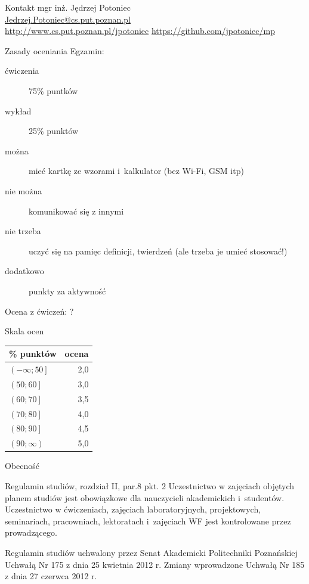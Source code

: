 \documentclass{mp}
\subtitle{Uwagi organizacyjne}
\begin{document}
\begin{frame}
\titlepage
\end{frame}
\begin{frame}{Kontakt}
mgr inż. Jędrzej Potoniec \\
\url{Jedrzej.Potoniec@cs.put.poznan.pl}\\
\url{http://www.cs.put.poznan.pl/jpotoniec}
\url{https://github.com/jpotoniec/mp}
\end{frame}
\begin{frame}{Zasady oceniania}
Egzamin:
\begin{description}
\item[ćwiczenia] 75\% puntków
\item[wykład] 25\% punktów
\item[można] mieć kartkę ze wzorami i~kalkulator (bez Wi-Fi, GSM itp)
\item[nie można] komunikować się z innymi
\item[nie trzeba] uczyć się na pamięc definicji, twierdzeń (ale trzeba je umieć stosować!)
\item[dodatkowo] punkty za aktywność
\end{description}

Ocena z ćwiczeń: \alert{?}
\end{frame}
\begin{frame}{Skala ocen}
\begin{center}
\begin{tabular}{l|r}
\% punktów & ocena \\
\hline
$\left(-\infty; 50\right]$ & 2,0 \\
$\left(50; 60\right]$ & 3,0 \\
$\left(60; 70\right]$ & 3,5 \\
$\left(70; 80\right]$ & 4,0 \\
$\left(80; 90\right]$ & 4,5 \\
$\left(90; \infty\right)$ & 5,0 \\
\end{tabular}
\end{center}
\end{frame}
\begin{frame}{Obecność}
\begin{block}{Regulamin studiów, rozdział II, par.8 pkt. 2}
Uczestnictwo w zajęciach objętych planem studiów jest obowiązkowe dla nauczycieli akademickich i~studentów.
Uczestnictwo w ćwiczeniach, zajęciach laboratoryjnych, projektowych, seminariach, pracowniach, lektoratach i~zajęciach WF jest kontrolowane przez prowadzącego.
\end{block}
{\tiny Regulamin studiów uchwalony przez Senat Akademicki Politechniki Poznańskiej Uchwałą Nr 175 z dnia 25 kwietnia 2012 r. Zmiany wprowadzone Uchwałą Nr 185 z dnia 27 czerwca 2012 r.}
\end{frame}
\end{document}
